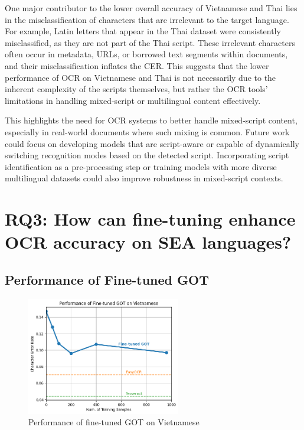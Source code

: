 \documentclass[12pt,oneside]{memoir}
\begin{document}
One major contributor to the lower overall accuracy of Vietnamese and Thai lies in the misclassification of characters that are irrelevant to the target language. 
For example, Latin letters that appear in the Thai dataset were consistently misclassified, as they are not part of the Thai script.
These irrelevant characters often occur in metadata, URLs, or borrowed text segments within documents, and their misclassification inflates the CER. 
This suggests that the lower performance of OCR on Vietnamese and Thai is not necessarily due to the inherent complexity of the scripts themselves, but rather the OCR tools’ limitations in handling mixed-script or multilingual content effectively.

This highlights the need for OCR systems to better handle mixed-script content, especially in real-world documents where such mixing is common. Future work could focus on developing models that are script-aware or capable of dynamically switching recognition modes based on the detected script. Incorporating script identification as a pre-processing step or training models with more diverse multilingual datasets could also improve robustness in mixed-script contexts.

\section{RQ3: How can fine-tuning enhance OCR accuracy on SEA languages?}

\subsection{Performance of Fine-tuned GOT}

\begin{figure}[ht]
    \centering
    \includegraphics[width=0.6\textwidth]{images/fine-tuned-got-vietnamese.png}
    \caption{Performance of fine-tuned GOT on Vietnamese}
    \label{figure:fine-tuned-got-vietnamese}
\end{figure}
\end{document}

